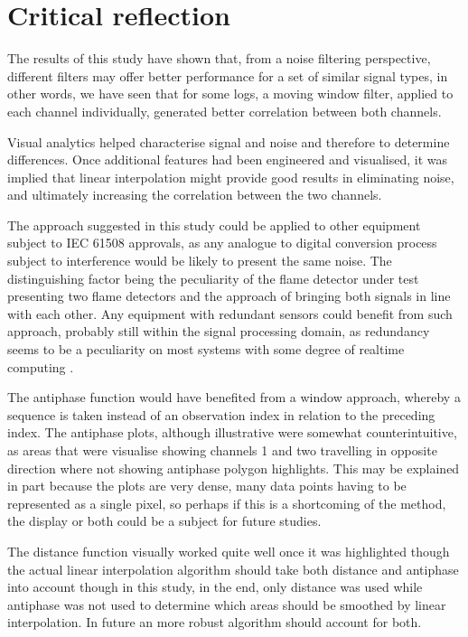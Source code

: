 \section{Critical reflection}

The results of this study have shown that, from a noise filtering perspective, different filters may offer better performance for a set of similar signal types, in other words, we have seen that for some logs, a moving window filter, applied to each channel individually, generated better correlation between both channels.

Visual analytics helped characterise signal and noise and therefore to determine differences. Once additional features had been engineered and visualised, it was implied that linear interpolation might provide good results in eliminating noise, and ultimately increasing the correlation between the two channels.

The approach suggested in this study could be applied to other equipment subject to IEC 61508 approvals, as any analogue to digital conversion process subject to interference would be likely to present the same noise. The distinguishing factor being the peculiarity of the flame detector under test presenting two flame detectors and the approach of bringing both signals in line with each other. Any equipment with redundant sensors could benefit from such approach, probably still within the signal processing domain, as redundancy seems to be a peculiarity on most systems with some degree of realtime computing \cite{Kane:1992}.

The antiphase function would have benefited from a window approach, whereby a sequence is taken instead of an observation index in relation to the preceding index. The antiphase plots, although illustrative were somewhat counterintuitive, as areas that were visualise showing channels 1 and two travelling in opposite direction where not showing antiphase polygon highlights. This may be explained in part because the plots are very dense, many data points having to be represented as a single pixel, so perhaps if this is a shortcoming of the method, the display or both could be a subject for future studies.

The distance function visually worked quite well once it was highlighted though the actual linear interpolation algorithm should take both distance and antiphase into account though in this study, in the end, only distance was used while antiphase was not used to determine which areas should be smoothed by linear interpolation. In future an more robust algorithm should account for both.

